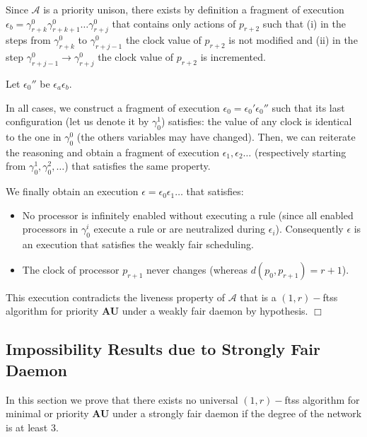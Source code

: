 \documentclass[11pt,english,letterpaper]{article}
\newenvironment{proof}{{\noindent\bf Proof. } }{{\hfill $\Box$}}
\begin{document}
\begin{proof}
\begin{description}
\begin{description}
\begin{description}
Since $\mathcal{A}$ is a priority unison, there exists by definition a fragment of execution $\epsilon_{b}=\gamma^{0}_{r+k}\gamma^{0}_{r+k+1}\ldots\gamma^{0}_{r+j}$ that contains only actions of $p_{r+2}$ such that (i) in the steps from $\gamma^{0}_{r+k}$ to $\gamma^{0}_{r+j-1}$ the clock value of $p_{r+2}$ is not modified and (ii) in the step	$\gamma^{0}_{r+j-1}\rightarrow\gamma^{0}_{r+j}$ the clock value of $p_{r+2}$ is incremented.						

Let $\epsilon_{0}''$ be $\epsilon_{a}\epsilon_{b}$.
\end{description}
\end{description}
\end{description}

In all cases, we construct a fragment of execution $\epsilon_{0}=\epsilon_{0}'\epsilon_{0}''$ such that its last configuration (let us denote it by $\gamma_{0}^{1}$) satisfies: the value of any clock is identical to the one in $\gamma^{0}_{0}$ (the others variables may have changed). Then, we can reiterate the reasoning and obtain a fragment of execution $\epsilon_{1},\epsilon_{2}\ldots$ (respectively starting from $\gamma_{0}^{1},\gamma_{0}^{2},\ldots$) that satisfies the same property.

We finally obtain an execution $\epsilon=\epsilon_{0}\epsilon_{1}\ldots$ that satisfies:

\begin{itemize}
\item No processor is infinitely enabled without executing a rule (since all enabled processors in $\gamma^{i}_{0}$ execute a rule or are neutralized during $\epsilon_{i}$). Consequently $\epsilon$ is an execution that satisfies the  weakly fair scheduling.
\item The clock of processor $p_{r+1}$ never changes (whereas $d(p_{0},p_{r+1})=r+1$).
\end{itemize}

This execution contradicts the liveness property of $\mathcal{A}$ that is a $(1,r)-$ftss algorithm for priority \textbf{AU} under a weakly fair daemon by hypothesis. 
\end{proof}

\subsection{Impossibility Results due to Strongly Fair Daemon}

In this section we prove that there exists no universal $(1,r)-$ftss algorithm for minimal or priority \textbf{AU} under a strongly fair daemon if the degree of the network is at least 3. 
\end{document}

